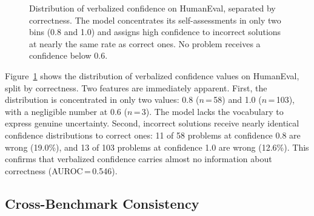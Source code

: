 \documentclass{article}
\begin{document}
\begin{figure}[t]
\centering
{}
\caption{Distribution of verbalized confidence on HumanEval, separated by correctness. The model concentrates its self-assessments in only two bins (0.8 and 1.0) and assigns high confidence to incorrect solutions at nearly the same rate as correct ones. No problem receives a confidence below 0.6.}
\label{fig:distribution}
\end{figure}

Figure~\ref{fig:distribution} shows the distribution of verbalized confidence values on HumanEval, split by correctness. Two features are immediately apparent. First, the distribution is concentrated in only two values: 0.8 ($n$\,=\,58) and 1.0 ($n$\,=\,103), with a negligible number at 0.6 ($n$\,=\,3). The model lacks the vocabulary to express genuine uncertainty. Second, incorrect solutions receive nearly identical confidence distributions to correct ones: 11 of 58 problems at confidence 0.8 are wrong (19.0\%), and 13 of 103 problems at confidence 1.0 are wrong (12.6\%). This confirms that verbalized confidence carries almost no information about correctness (AUROC\,=\,0.546).

\subsection{Cross-Benchmark Consistency}
\end{document}
